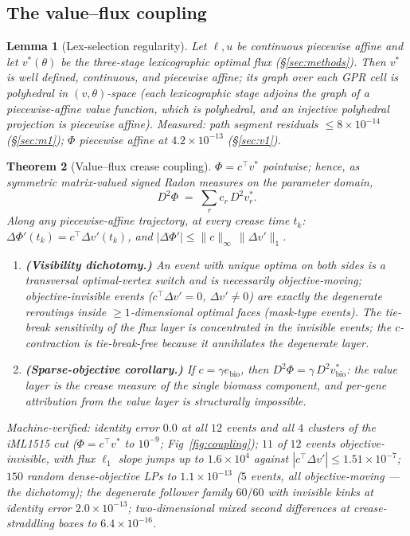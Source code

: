 \documentclass[11pt,a4paper]{article}
\theoremstyle{plain}
\newtheorem{theorem}{Theorem}[section]
\newtheorem{lemma}[theorem]{Lemma}
\theoremstyle{definition}
\theoremstyle{remark}
\begin{document}
\subsection{The value--flux coupling}

\begin{lemma}[Lex-selection regularity]\label{lem:lex}
Let $\ell, u$ be continuous piecewise affine and let $v^*(\theta)$ be
the three-stage lexicographic optimal flux (\S\ref{sec:methods}).
Then $v^*$ is well defined, continuous, and piecewise affine; its
graph over each GPR cell is polyhedral in $(v,\theta)$-space (each
lexicographic stage adjoins the graph of a piecewise-affine value
function, which is polyhedral, and an injective polyhedral projection
is piecewise affine). Measured: path segment residuals $\le 8 \times 10^{-14}$ (\S\ref{sec:m1}); $\Phi$ piecewise affine at $4.2 \times 10^{-13}$ (\S\ref{sec:v1}).
\end{lemma}

\begin{theorem}[Value--flux crease coupling]\label{thm:coupling}
$\Phi = c^\top v^*$ pointwise; hence, as symmetric matrix-valued
signed Radon measures on the parameter domain,
\[
D^2\Phi \;=\; \sum_{r} c_r\, D^2 v^*_r .
\]
Along any piecewise-affine trajectory, at every crease time $t_k$:
$\Delta\Phi'(t_k) = c^\top \Delta v'(t_k)$, and
$|\Delta\Phi'| \le \|c\|_\infty \,\|\Delta v'\|_1$.
\begin{enumerate}[label=(\roman*),leftmargin=2em]
\item \textbf{(Visibility dichotomy.)} An event with unique optima
      on both sides is a transversal optimal-vertex switch and is
      necessarily objective-moving; objective-invisible events
      ($c^\top \Delta v' = 0$, $\Delta v' \neq 0$) are exactly the
      degenerate reroutings inside $\ge 1$-dimensional optimal faces
      (mask-type events). The tie-break sensitivity of the flux layer
      is concentrated in the invisible events; the $c$-contraction is
      tie-break-free because it annihilates the degenerate layer.
\item \textbf{(Sparse-objective corollary.)} If $c =
      \gamma e_{\mathrm{bio}}$, then $D^2\Phi = \gamma\, D^2
      v^*_{\mathrm{bio}}$: the value layer is the crease measure of
      the single biomass component, and per-gene attribution from the
      value layer is structurally impossible.
\end{enumerate}
Machine-verified: identity error $0.0$ at all $12$ events and all
$4$ clusters of the iML1515 cut ($\Phi = c^\top v^*$ to $10^{-9}$;
Fig~\ref{fig:coupling});
$11$ of $12$ events objective-invisible, with flux $\ell_1$ slope
jumps up to $1.6 \times 10^{4}$ against $|c^\top \Delta v'| \le
1.51 \times 10^{-7}$; $150$ random dense-objective LPs to $1.1 \times
10^{-13}$ ($5$ events, all objective-moving --- the dichotomy); the
degenerate follower family $60/60$ with invisible kinks at identity
error $2.0 \times 10^{-13}$; two-dimensional mixed second
differences at crease-straddling boxes to $6.4 \times 10^{-16}$.
\end{theorem}
\end{document}
